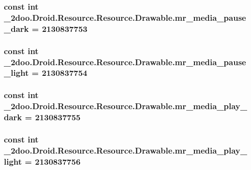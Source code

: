 \hypertarget{class__2doo_1_1_droid_1_1_resource_1_1_drawable_b56b11deabe64ba220c09aa24d81a68b}{
\subsubsection[{mr\_\-media\_\-pause\_\-dark}]{\setlength{\rightskip}{0pt plus 5cm}const int \_\-2doo.Droid.Resource.Resource.Drawable.mr\_\-media\_\-pause\_\-dark = 2130837753}}
\label{class__2doo_1_1_droid_1_1_resource_1_1_drawable_b56b11deabe64ba220c09aa24d81a68b}


\hypertarget{class__2doo_1_1_droid_1_1_resource_1_1_drawable_a30364b71d8fe7f5ffcbe8c532ba047d}{
\subsubsection[{mr\_\-media\_\-pause\_\-light}]{\setlength{\rightskip}{0pt plus 5cm}const int \_\-2doo.Droid.Resource.Resource.Drawable.mr\_\-media\_\-pause\_\-light = 2130837754}}
\label{class__2doo_1_1_droid_1_1_resource_1_1_drawable_a30364b71d8fe7f5ffcbe8c532ba047d}


\hypertarget{class__2doo_1_1_droid_1_1_resource_1_1_drawable_2e2e9796ac5bdac4e3748f9992425392}{
\subsubsection[{mr\_\-media\_\-play\_\-dark}]{\setlength{\rightskip}{0pt plus 5cm}const int \_\-2doo.Droid.Resource.Resource.Drawable.mr\_\-media\_\-play\_\-dark = 2130837755}}
\label{class__2doo_1_1_droid_1_1_resource_1_1_drawable_2e2e9796ac5bdac4e3748f9992425392}


\hypertarget{class__2doo_1_1_droid_1_1_resource_1_1_drawable_8568230ecaa349c3b0dea1a9918730cb}{
\subsubsection[{mr\_\-media\_\-play\_\-light}]{\setlength{\rightskip}{0pt plus 5cm}const int \_\-2doo.Droid.Resource.Resource.Drawable.mr\_\-media\_\-play\_\-light = 2130837756}}
\label{class__2doo_1_1_droid_1_1_resource_1_1_drawable_8568230ecaa349c3b0dea1a9918730cb}


